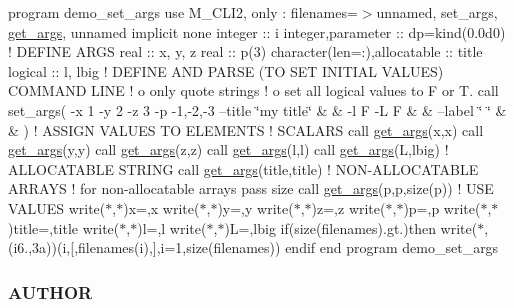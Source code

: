 program demo\+\_\+set\+\_\+args use M\+\_\+\+C\+L\+I2, only \+: filenames=$>$unnamed, set\+\_\+args, \mbox{\hyperlink{interfacem__cli2_1_1get__args}{get\+\_\+args}}, unnamed implicit none integer \+:\+: i integer,parameter \+:\+: dp=kind(0.\+0d0) ! D\+E\+F\+I\+NE A\+R\+GS real \+:\+: x, y, z real \+:\+: p(3) character(len=\+:),allocatable \+:\+: title logical \+:\+: l, lbig ! D\+E\+F\+I\+NE A\+ND P\+A\+R\+SE (TO S\+ET I\+N\+I\+T\+I\+AL V\+A\+L\+U\+ES) C\+O\+M\+M\+A\+ND L\+I\+NE ! o only quote strings ! o set all logical values to F or T. call set\+\_\+args(\textquotesingle{} -\/x 1 -\/y 2 -\/z 3 -\/p -\/1,-\/2,-\/3 --title \char`\"{}my title\char`\"{} \& \& -\/l F -\/L F \& \& --label \char`\"{} \char`\"{} \& \& \textquotesingle{}) ! A\+S\+S\+I\+GN V\+A\+L\+U\+ES TO E\+L\+E\+M\+E\+N\+TS ! S\+C\+A\+L\+A\+RS call \mbox{\hyperlink{interfacem__cli2_1_1get__args}{get\+\_\+args}}(\textquotesingle{}x\textquotesingle{},x) call \mbox{\hyperlink{interfacem__cli2_1_1get__args}{get\+\_\+args}}(\textquotesingle{}y\textquotesingle{},y) call \mbox{\hyperlink{interfacem__cli2_1_1get__args}{get\+\_\+args}}(\textquotesingle{}z\textquotesingle{},z) call \mbox{\hyperlink{interfacem__cli2_1_1get__args}{get\+\_\+args}}(\textquotesingle{}l\textquotesingle{},l) call \mbox{\hyperlink{interfacem__cli2_1_1get__args}{get\+\_\+args}}(\textquotesingle{}L\textquotesingle{},lbig) ! A\+L\+L\+O\+C\+A\+T\+A\+B\+LE S\+T\+R\+I\+NG call \mbox{\hyperlink{interfacem__cli2_1_1get__args}{get\+\_\+args}}(\textquotesingle{}title\textquotesingle{},title) ! N\+O\+N-\/\+A\+L\+L\+O\+C\+A\+T\+A\+B\+LE A\+R\+R\+A\+YS ! for non-\/allocatable arrays pass size call \mbox{\hyperlink{interfacem__cli2_1_1get__args}{get\+\_\+args}}(\textquotesingle{}p\textquotesingle{},p,size(p)) ! U\+SE V\+A\+L\+U\+ES write($\ast$,$\ast$)\textquotesingle{}x=\textquotesingle{},x write($\ast$,$\ast$)\textquotesingle{}y=\textquotesingle{},y write($\ast$,$\ast$)\textquotesingle{}z=\textquotesingle{},z write($\ast$,$\ast$)\textquotesingle{}p=\textquotesingle{},p write($\ast$,$\ast$)\textquotesingle{}title=\textquotesingle{},title write($\ast$,$\ast$)\textquotesingle{}l=\textquotesingle{},l write($\ast$,$\ast$)\textquotesingle{}L=\textquotesingle{},lbig if(size(filenames).gt.)then write($\ast$,\textquotesingle{}(i6.,3a)\textquotesingle{})(i,\textquotesingle{}\mbox{[}\textquotesingle{},filenames(i),\textquotesingle{}\mbox{]}\textquotesingle{},i=1,size(filenames)) endif end program demo\+\_\+set\+\_\+args \subsubsection*{A\+U\+T\+H\+OR}

